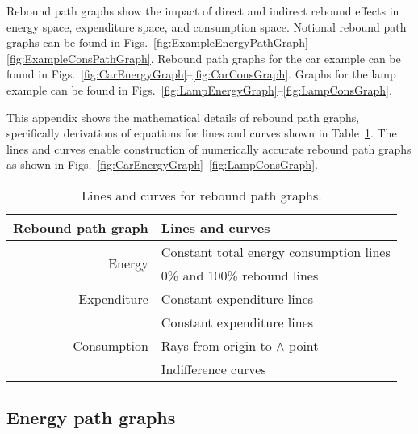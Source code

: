 
Rebound path graphs show the impact of direct and indirect rebound effects
in energy space, expenditure space, and consumption space.
Notional rebound path graphs can be found in 
Figs.~\ref{fig:ExampleEnergyPathGraph}--\ref{fig:ExampleConsPathGraph}.
Rebound path graphs for the car example can be found in 
Figs.~\ref{fig:CarEnergyGraph}--\ref{fig:CarConsGraph}.
Graphs for the lamp example can be found in
Figs.~\ref{fig:LampEnergyGraph}--\ref{fig:LampConsGraph}.

This appendix shows the mathematical details of rebound path graphs,
specifically derivations of equations for lines and curves 
shown in Table~\ref{tab:lines_and_curves}.
The lines and curves enable construction of numerically accurate
rebound path graphs 
as shown in Figs.~\ref{fig:CarEnergyGraph}--\ref{fig:LampConsGraph}.

\begin{table}
\centering
\caption{Lines and curves for rebound path graphs.}
\label{tab:lines_and_curves}
\begin{tabular}{rl}
\toprule
Rebound path graph           & Lines and curves                        \\ 
\midrule
\multirow{2}{*}{Energy}      & Constant total energy consumption lines \\
                             & 0\% and 100\% rebound lines             \\
\midrule
Expenditure                  & Constant expenditure lines              \\
\midrule
\multirow{3}{*}{Consumption} & Constant expenditure lines              \\
                             & Rays from origin to $\wedge$ point      \\
                             & Indifference curves                     \\
\bottomrule
\end{tabular}
\end{table}


\subsection{Energy path graphs}
\label{sec:energy_path_graph_details}

